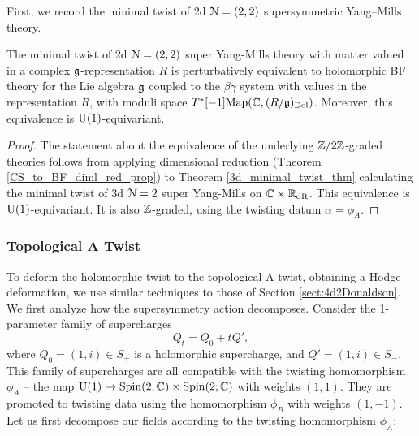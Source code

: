 \documentclass[10pt, oneside]{article}
\renewcommand{\U}{\mathrm{U}}
\begin{document}
First, we record the minimal twist of 2d $\mathcal N=(2,2)$ supersymmetric Yang--Mills theory.

\begin{theorem} \label{2d_minimal_twist_thm}
The minimal twist of 2d $\mathcal N=(2,2)$ super Yang-Mills theory with matter valued in a complex $\mathfrak g$-representation $R$ is perturbatively equivalent to holomorphic BF theory for the Lie algebra $\mathfrak g$ coupled to the $\beta\gamma$ system with values in the representation $R$, with moduli space $T^*[-1]\mathrm{Map}(\mathbb C, (R/\mathfrak{g})_{\mathrm{Dol}})$.  
Moreover, this equivalence is $\mathrm{U}(1)$-equivariant.
\end{theorem}

\begin{proof}
The statement about the equivalence of the underlying $\mathbb Z/2\mathbb Z$-graded theories follows from applying dimensional reduction (Theorem \ref{CS_to_BF_diml_red_prop}) to Theorem \ref{3d_minimal_twist_thm} calculating the minimal twist of 3d $\mathcal{N}=2$ super Yang-Mills on $\mathbb C \times \mathbb R_{\mathrm{dR}}$.  This equivalence is $\mathrm{U}(1)$-equivariant.  It is also $\mathbb Z$-graded, using the twisting datum $\alpha = \phi_A$.
\end{proof}

\subsubsection{Topological A Twist} \label{sect:2d22Atwist}

To deform the holomorphic twist to the topological A-twist, obtaining a Hodge deformation, we use similar techniques to those of Section \ref{sect:4d2Donaldson}.  We first analyze how the supersymmetry action decomposes.  Consider the 1-parameter family of supercharges
\begin{equation} \label{eq:2dHodgefamily}
Q_t = Q_0 + tQ',
\end{equation}
where $Q_0 = (1,i) \in S_+$ is a holomorphic supercharge, and $Q' = (1,i) \in S_-$.  This family of supercharges are all compatible with the twisting homomorphism $\phi_A$ -- the map $\U(1) \to \spin(2;\CC) \times \spin(2;\CC)$ with weights $(1,1)$.  They are promoted to twisting data using the homomorphism $\phi_B$ with weights $(1,-1)$.  Let us first decompose our fields according to the twisting homomorphism $\phi_A$:
\end{document}
